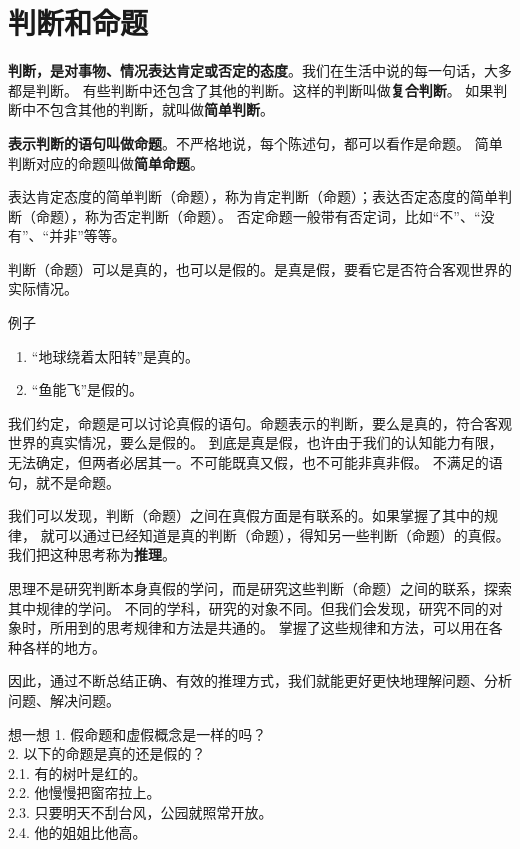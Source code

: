 \documentclass[12pt,UTF8,a4paper]{article}
\begin{document}
\section{判断和命题}

\textbf{判断，是对事物、情况表达肯定或否定的态度}。我们在生活中说的每一句话，大多都是判断。
有些判断中还包含了其他的判断。这样的判断叫做\textbf{复合判断}。
如果判断中不包含其他的判断，就叫做\textbf{简单判断}。

\textbf{表示判断的语句叫做命题}。不严格地说，每个陈述句，都可以看作是命题。
简单判断对应的命题叫做\textbf{简单命题}。

表达肯定态度的简单判断（命题），称为肯定判断（命题）；表达否定态度的简单判断（命题），称为否定判断（命题）。
否定命题一般带有否定词，比如“不”、“没有”、“并非”等等。

判断（命题）可以是真的，也可以是假的。是真是假，要看它是否符合客观世界的实际情况。

\begin{blockin}{例子}
    \begin{enumerate}
        \item “地球绕着太阳转”是真的。
        \item “鱼能飞”是假的。
    \end{enumerate}
\end{blockin}

我们约定，命题是可以讨论真假的语句。命题表示的判断，要么是真的，符合客观世界的真实情况，要么是假的。
到底是真是假，也许由于我们的认知能力有限，无法确定，但两者必居其一。不可能既真又假，也不可能非真非假。
不满足的语句，就不是命题。

我们可以发现，判断（命题）之间在真假方面是有联系的。如果掌握了其中的规律，
就可以通过已经知道是真的判断（命题），得知另一些判断（命题）的真假。我们把这种思考称为\textbf{推理}。

思理不是研究判断本身真假的学问，而是研究这些判断（命题）之间的联系，探索其中规律的学问。
不同的学科，研究的对象不同。但我们会发现，研究不同的对象时，所用到的思考规律和方法是共通的。
掌握了这些规律和方法，可以用在各种各样的地方。

因此，通过不断总结正确、有效的推理方式，我们就能更好更快地理解问题、分析问题、解决问题。

\begin{blockaft}{想一想}
    1. 假命题和虚假概念是一样的吗？\\
    2. 以下的命题是真的还是假的？\\
    2.1. 有的树叶是红的。 \\
    2.2. 他慢慢把窗帘拉上。\\
    2.3. 只要明天不刮台风，公园就照常开放。\\
    2.4. 他的姐姐比他高。
\end{blockaft}
\end{document}
